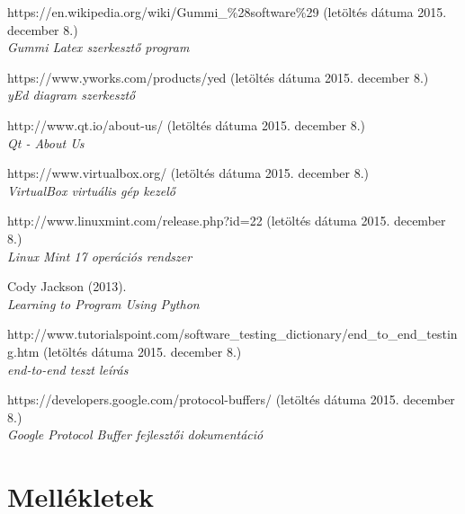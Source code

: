 \documentclass[a4paper,12pt,oneside]{report}
\begin{document}
\begin{thebibliography}{99}
                        
		https://en.wikipedia.org/wiki/Gummi\_\%28software\%29
		(letöltés dátuma 2015. december 8.)\\
        {\em Gummi Latex szerkesztő program \\}
        
         
		https://www.yworks.com/products/yed
		(letöltés dátuma 2015. december 8.)\\
        {\em yEd diagram szerkesztő\\}
       
        http://www.qt.io/about-us/
        (letöltés dátuma 2015. december 8.)\\
        {\em Qt - About Us \\}
                

        https://www.virtualbox.org/
        (letöltés dátuma 2015. december 8.)\\
        {\em VirtualBox virtuális gép kezelő \\}
        
        http://www.linuxmint.com/release.php?id=22
        (letöltés dátuma 2015. december 8.)\\
        {\em Linux Mint 17 operációs rendszer\\}
        
		Cody Jackson (2013). \\
        {\em Learning to Program Using Python \\}
        

        http://www.tutorialspoint.com/software\_testing\_dictionary/end\_to\_end\_testing.htm
        (letöltés dátuma 2015. december 8.)\\
    {\em end-to-end teszt leírás \\}

        https://developers.google.com/protocol-buffers/
        (letöltés dátuma 2015. december 8.)\\
    {\em Google Protocol Buffer fejlesztői dokumentáció\\}


\end{thebibliography}


\section{Mellékletek}
\end{document}
